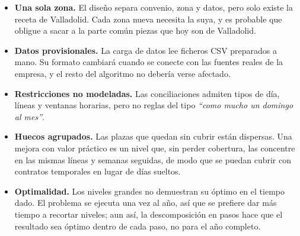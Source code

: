 \documentclass[11pt,a4paper]{article}
\begin{document}
\begin{itemize}
  \item \textbf{Una sola zona.} El diseño separa convenio, zona y datos, pero solo existe la
        receta de Valladolid. Cada zona nueva necesita la suya, y es probable que obligue a
        sacar a la parte común piezas que hoy son de Valladolid.
  \item \textbf{Datos provisionales.} La carga de datos lee ficheros CSV preparados a mano. Su
        formato cambiará cuando se conecte con las fuentes reales de la empresa, y el resto del
        algoritmo no debería verse afectado.
  \item \textbf{Restricciones no modeladas.} Las conciliaciones admiten tipos de día, líneas y
        ventanas horarias, pero no reglas del tipo \emph{``como mucho un domingo al mes''}.
  \item \textbf{Huecos agrupados.} Las plazas que quedan sin cubrir están dispersas. Una mejora
        con valor práctico es un nivel que, sin perder cobertura, las concentre en las mismas
        líneas y semanas seguidas, de modo que se puedan cubrir con contratos temporales en
        lugar de días sueltos.
  \item \textbf{Optimalidad.} Los niveles grandes no demuestran su óptimo en el tiempo dado. El
        problema se ejecuta una vez al año, así que se prefiere dar más tiempo a recortar
        niveles; aun así, la descomposición en pasos hace que el resultado sea óptimo dentro de
        cada paso, no para el año completo.
\end{itemize}
\end{document}
